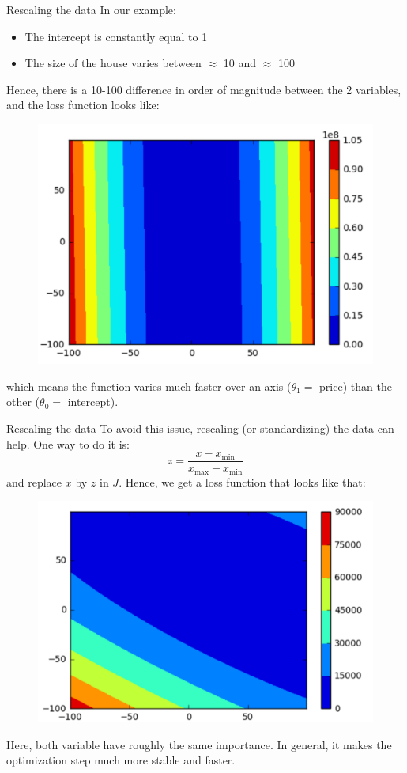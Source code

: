 \documentclass{beamer}
\newcommand{\1}[1]{\mathbbm{1}\left[#1\right]}
\begin{document}
\begin{frame}{Rescaling the data} 
In our example:
\begin{itemize}
	\item The intercept is constantly equal to 1
	\item The size of the house varies between $\approx$ 10 and $\approx$ 100
\end{itemize}
\vfill
\pause
Hence, there is a 10-100 difference in order of magnitude between the 2 variables, and the loss function looks like: 
\begin{figure}
\centering
\includegraphics[width=.6\linewidth]{images/unnormalized_loss.png}
\end{figure}
which means the function varies much faster over an axis ($\theta_1 = $ price) than the other ($\theta_0 = $ intercept).
\end{frame}

\begin{frame}{Rescaling the data}
To avoid this issue, rescaling (or standardizing) the data can help. One way to do it is:
$$ z = \dfrac{x - x_{\min}}{x_{\max} - x_{\min}} $$
and replace $x$ by $z$ in $J$. Hence, we get a loss function that looks like that:
\begin{figure}
\centering
\includegraphics[width=.6\linewidth]{images/normalized_loss.png}
\end{figure}
\vfill
\pause
Here, both variable have roughly the same importance. In general, it makes the optimization step much more stable and faster.
\end{frame}
\end{document}
